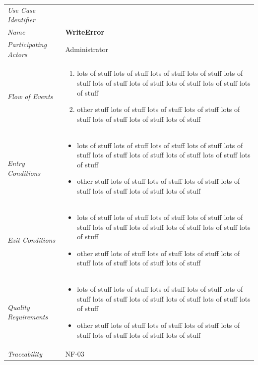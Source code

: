 \documentclass[12pt,letterpaper]{article}
\begin{document}
\begin{center}
	\begin{tabu} to 
		\toprule
		Use Case Identifier & \writeerror{} \\
		Name & {\bf WriteError} \\
		Participating Actors & Administrator \\
		Flow of Events & 
	    \begin{enumerate}[topsep=-1em]
		    \item lots of stuff lots of stuff lots of stuff lots of stuff lots of stuff lots of stuff lots of stuff lots of stuff lots of stuff lots of stuff
		    \item other stuff lots of stuff lots of stuff lots of stuff lots of stuff lots of stuff lots of stuff lots of stuff
		\end{enumerate} \\

		Entry Conditions &
		\begin{itemize}[topsep=-1em]
		    \item lots of stuff lots of stuff lots of stuff lots of stuff lots of stuff lots of stuff lots of stuff lots of stuff lots of stuff lots of stuff
		    \item other stuff lots of stuff lots of stuff lots of stuff lots of stuff lots of stuff lots of stuff lots of stuff
        \end{itemize} \\

		Exit Conditions &
		\begin{itemize}[topsep=-1em]
		    \item lots of stuff lots of stuff lots of stuff lots of stuff lots of stuff lots of stuff lots of stuff lots of stuff lots of stuff lots of stuff
		    \item other stuff lots of stuff lots of stuff lots of stuff lots of stuff lots of stuff lots of stuff lots of stuff
        \end{itemize} \\

		Quality Requirements &
		\begin{itemize}[topsep=-1em]
		    \item lots of stuff lots of stuff lots of stuff lots of stuff lots of stuff lots of stuff lots of stuff lots of stuff lots of stuff lots of stuff
		    \item other stuff lots of stuff lots of stuff lots of stuff lots of stuff lots of stuff lots of stuff lots of stuff
        \end{itemize} \\

		Traceability & NF-03 \\
		\toprule
	\end{tabu}
\end{center}
\end{document}
